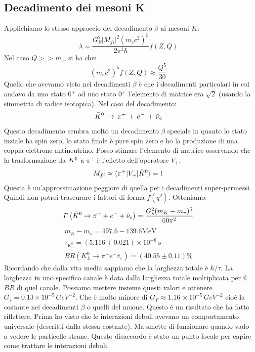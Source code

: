 \subsection{Decadimento dei mesoni K}
Applichiamo lo stesso approccio del decadimento $\beta$ ai mesoni $K$:
\begin{equation*}
    \lambda=\frac{G_F^2|M_{fi}|^2(m_ec^2)^5}{2\pi^3\hbar}f(Z,Q)
\end{equation*}
Nel caso $Q>>m_e$, si ha che:
\begin{equation*}
    (m_ec^2)^5f(Z,Q)\approx\frac{Q^5}{30}
\end{equation*}
Quello che avevamo visto nei decadimenti $\beta$ è che i decadimenti particolari in cui andavo da uno stato $0^+$ ad uno stato $0^+$ l'elemento di matrice era $\sqrt{2}$ (usando la simmetria di radice isotopica).
Nel caso del decadimento:
\begin{equation*}
    \Bar{K}^0\,\to\,\pi^+\,+\,e^-\,+\,\Bar{\nu}_e
\end{equation*}
Questo decadimento sembra molto un decadimento $\beta$ speciale in quanto lo stato inziale ha spin zero, lo stato finale è pure spin zero e ho la produzione di una coppia elettrone antineutrino. Posso stimare l'elemento di matrice osservando che la trasformazione da $ \Bar{K^0}$ a $\pi^+$ è l'effetto dell'operatore $V_+$.
\begin{equation*}
    M_{fi}\approx\langle\pi^+|V_+|\Bar{K}^0\rangle=1
\end{equation*}
Questa è un'approssimazione peggiore di quella per i decadimenti super-permessi. Quindi non potrei trascurare i fattori di forma $f(q^2)$. Otteniamo:
\begin{equation*}
    \Gamma\left(\Bar{K}^0\to\pi^++e^-+\Bar{\nu}_e\right)=\frac{G_s^2(m_K-m_\pi)^5}{60\pi^2}
\end{equation*}
\begin{align*}
     m_K-m_\pi=497.6-139.6 \mathrm{MeV} \\  \tau_{\mathrm{K}_{\mathrm{L}}^0}=(5.116 \pm 0.021) \times 10^{-8} \mathrm{~s} \\  B R\left(K_L^0 \rightarrow \pi^{+} e^{-} \bar{v}_e\right)=(40.55 \pm 0.11) \%
\end{align*}
Ricordando che dalla vita media sappiamo che la larghezza totale è $\hbar/\tau$. La larghezza in uno specifico canale è data dalla larghezza totale moltiplicata per il $BR$ di quel canale.
Possiamo mettere insieme questi valori e ottenere $G_s=0.13\times10^{-5}\,GeV^{-2}$. Che è molto minore di $G_F\approx 1.16\,\times10^{-5}\,GeV^{-2}$ cioè la costante nei decadimenti $\beta$ o quelli del muone. Questo è un risultato che ha fatto riflettere. Prima ho visto che le interazioni deboli avevano un comportamento universale (descritti dalla stessa costante). Ma smette di funzionare quando vado a vedere le particelle strane. Questo disaccordo è stato un punto focale per capire come trattare le interazioni deboli. 
